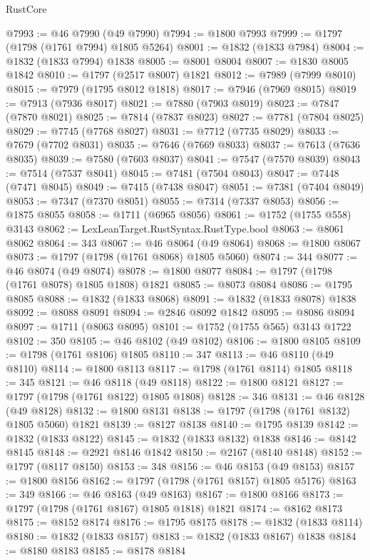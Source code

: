 \begin{lexlean}{RustCore}
\begin{coremodule}
@7993 := @46 @7990 (@49 @7990)
@7994 := @1800 @7993
@7999 := @1797 (@1798 (@1761 @7994) @1805 @5264)
@8001 := @1832 (@1833 @7984)
@8004 := @1832 (@1833 @7994) @1838
@8005 := @8001 @8004
@8007 := @1830 @8005 @1842
@8010 := @1797 (@2517 @8007) @1821
@8012 := @7989 (@7999 @8010)
@8015 := @7979 (@1795 @8012 @1818)
@8017 := @7946 (@7969 @8015)
@8019 := @7913 (@7936 @8017)
@8021 := @7880 (@7903 @8019)
@8023 := @7847 (@7870 @8021)
@8025 := @7814 (@7837 @8023)
@8027 := @7781 (@7804 @8025)
@8029 := @7745 (@7768 @8027)
@8031 := @7712 (@7735 @8029)
@8033 := @7679 (@7702 @8031)
@8035 := @7646 (@7669 @8033)
@8037 := @7613 (@7636 @8035)
@8039 := @7580 (@7603 @8037)
@8041 := @7547 (@7570 @8039)
@8043 := @7514 (@7537 @8041)
@8045 := @7481 (@7504 @8043)
@8047 := @7448 (@7471 @8045)
@8049 := @7415 (@7438 @8047)
@8051 := @7381 (@7404 @8049)
@8053 := @7347 (@7370 @8051)
@8055 := @7314 (@7337 @8053)
@8056 := @1875 @8055
@8058 := @1711 (@6965 @8056)
@8061 := @1752 (@1755 @558) @3143
@8062 := LexLeanTarget.RustSyntax.RustType.bool
@8063 := @8061 @8062
@8064 := 343
@8067 := @46 @8064 (@49 @8064)
@8068 := @1800 @8067
@8073 := @1797 (@1798 (@1761 @8068) @1805 @5060)
@8074 := 344
@8077 := @46 @8074 (@49 @8074)
@8078 := @1800 @8077
@8084 := @1797 (@1798 (@1761 @8078) @1805 @1808) @1821
@8085 := @8073 @8084
@8086 := @1795 @8085
@8088 := @1832 (@1833 @8068)
@8091 := @1832 (@1833 @8078) @1838
@8092 := @8088 @8091
@8094 := @2846 @8092 @1842
@8095 := @8086 @8094
@8097 := @1711 (@8063 @8095)
@8101 := @1752 (@1755 @565) @3143 @1722
@8102 := 350
@8105 := @46 @8102 (@49 @8102)
@8106 := @1800 @8105
@8109 := @1798 (@1761 @8106) @1805
@8110 := 347
@8113 := @46 @8110 (@49 @8110)
@8114 := @1800 @8113
@8117 := @1798 (@1761 @8114) @1805
@8118 := 345
@8121 := @46 @8118 (@49 @8118)
@8122 := @1800 @8121
@8127 := @1797 (@1798 (@1761 @8122) @1805 @1808)
@8128 := 346
@8131 := @46 @8128 (@49 @8128)
@8132 := @1800 @8131
@8138 := @1797 (@1798 (@1761 @8132) @1805 @5060) @1821
@8139 := @8127 @8138
@8140 := @1795 @8139
@8142 := @1832 (@1833 @8122)
@8145 := @1832 (@1833 @8132) @1838
@8146 := @8142 @8145
@8148 := @2921 @8146 @1842
@8150 := @2167 (@8140 @8148)
@8152 := @1797 (@8117 @8150)
@8153 := 348
@8156 := @46 @8153 (@49 @8153)
@8157 := @1800 @8156
@8162 := @1797 (@1798 (@1761 @8157) @1805 @5176)
@8163 := 349
@8166 := @46 @8163 (@49 @8163)
@8167 := @1800 @8166
@8173 := @1797 (@1798 (@1761 @8167) @1805 @1818) @1821
@8174 := @8162 @8173
@8175 := @8152 @8174
@8176 := @1795 @8175
@8178 := @1832 (@1833 @8114)
@8180 := @1832 (@1833 @8157)
@8183 := @1832 (@1833 @8167) @1838
@8184 := @8180 @8183
@8185 := @8178 @8184

\end{coremodule}
\end{lexlean}
